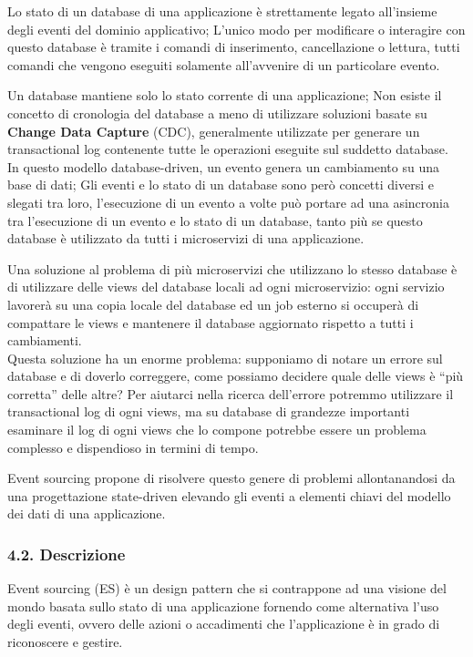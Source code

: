 \documentclass[]{article}
\begin{document}
Lo stato di un database di una applicazione è strettamente legato
all'insieme degli eventi del dominio applicativo; L'unico modo per
modificare o interagire con questo database è tramite i comandi di
inserimento, cancellazione o lettura, tutti comandi che vengono eseguiti
solamente all'avvenire di un particolare evento.

Un database mantiene solo lo stato corrente di una applicazione; Non
esiste il concetto di cronologia del database a meno di utilizzare
soluzioni basate su \textbf{Change Data Capture} (CDC), generalmente
utilizzate per generare un transactional log contenente tutte le
operazioni eseguite sul suddetto database.\\
In questo modello database-driven, un evento genera un cambiamento su
una base di dati; Gli eventi e lo stato di un database sono però
concetti diversi e slegati tra loro, l'esecuzione di un evento a volte
può portare ad una asincronia tra l'esecuzione di un evento e lo stato
di un database, tanto più se questo database è utilizzato da tutti i
microservizi di una applicazione.

Una soluzione al problema di più microservizi che utilizzano lo stesso
database è di utilizzare delle views del database locali ad ogni
microservizio: ogni servizio lavorerà su una copia locale del database
ed un job esterno si occuperà di compattare le views e mantenere il
database aggiornato rispetto a tutti i cambiamenti.\\
Questa soluzione ha un enorme problema: supponiamo di notare un errore
sul database e di doverlo correggere, come possiamo decidere quale delle
views è ``più corretta'' delle altre? Per aiutarci nella ricerca
dell'errore potremmo utilizzare il transactional log di ogni views, ma
su database di grandezze importanti esaminare il log di ogni views che
lo compone potrebbe essere un problema complesso e dispendioso in
termini di tempo.

Event sourcing propone di risolvere questo genere di problemi
allontanandosi da una progettazione state-driven elevando gli eventi a
elementi chiavi del modello dei dati di una applicazione.

\subsubsection{4.2. Descrizione}\label{descrizione}

Event sourcing (ES) è un design pattern che si contrappone ad una
visione del mondo basata sullo stato di una applicazione fornendo come
alternativa l'uso degli eventi, ovvero delle azioni o accadimenti che
l'applicazione è in grado di riconoscere e gestire.
\end{document}
